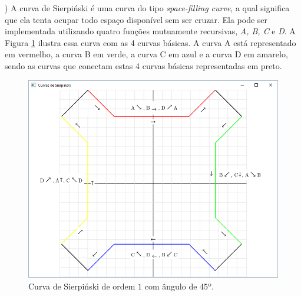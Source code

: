\begin{renumerate}
\item)
 A curva de Sierpiński é uma curva do tipo \emph{space-filling curve}, a qual significa que ela tenta ocupar todo espaço disponível sem ser cruzar. Ela pode ser implementada utilizando quatro funções mutuamente recursivas, \emph{A, B, C} e \emph{D}. A Figura \ref{fig:cap04_ex16} ilustra essa curva com as 4 curvas básicas. A curva A está representado em vermelho, a curva B em verde, a curva C em azul e a curva D em amarelo, sendo as curvas que conectam estas 4 curvas básicas representadas em preto.

   \begin{figure}[H]
    \centerline{\includegraphics[width=1.0\textwidth]{img/cap4_ex16.png}}
    \caption{Curva de Sierpiński de ordem $1$ com ângulo de $45º$.}
    \label{fig:cap04_ex16}
  \end{figure}



\end{renumerate}
